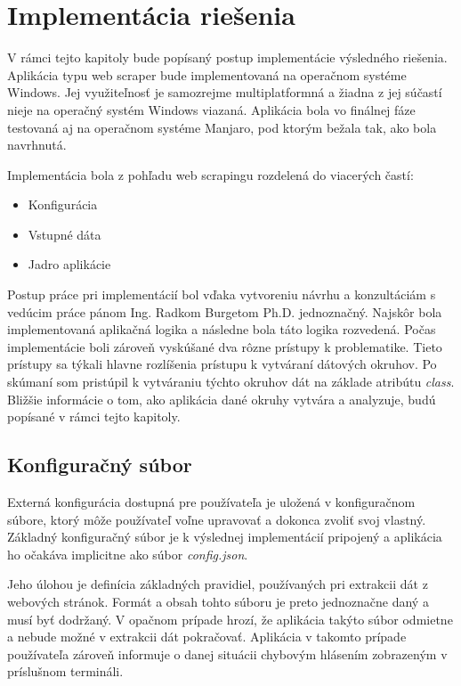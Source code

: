 \chapter{Implementácia riešenia}
\label{implementacia}

V rámci tejto kapitoly bude popísaný postup implementácie výsledného riešenia. Aplikácia typu web scraper bude implementovaná na operačnom systéme Windows. Jej využiteľnosť je samozrejme multiplatformná a žiadna z jej súčastí nieje na operačný systém Windows viazaná. Aplikácia bola vo finálnej fáze testovaná aj na operačnom systéme Manjaro, pod ktorým bežala tak, ako bola navrhnutá.

Implementácia bola z pohľadu web scrapingu rozdelená do viacerých častí:

\begin{itemize}
    \item {Konfigurácia}
    \item {Vstupné dáta}
    \item {Jadro aplikácie}
\end{itemize}

\bigskip

Postup práce pri implementácií bol vďaka vytvoreniu návrhu a konzultáciám s vedúcim práce pánom Ing. Radkom Burgetom Ph.D. jednoznačný. Najskôr bola implementovaná aplikačná logika a následne bola táto logika rozvedená. Počas implementácie boli zároveň vyskúšané dva rôzne prístupy k problematike. Tieto prístupy sa týkali hlavne rozlíšenia prístupu k vytváraní dátových okruhov. Po skúmaní som pristúpil k vytváraniu týchto okruhov dát na základe atribútu \textit{class}. Bližšie informácie o tom, ako aplikácia dané okruhy vytvára a analyzuje, budú popísané v rámci tejto kapitoly.

\section{Konfiguračný súbor}

Externá konfigurácia dostupná pre používateľa je uložená v konfiguračnom súbore, ktorý môže používateľ voľne upravovať a dokonca zvoliť svoj vlastný. Základný konfiguračný súbor je k výslednej implementácií pripojený a aplikácia ho očakáva implicitne ako súbor \textit{config.json}.

Jeho úlohou je definícia základných pravidiel, používaných pri extrakcii dát z webových stránok. Formát a obsah tohto súboru je preto jednoznačne daný a musí byť dodržaný. V opačnom prípade hrozí, že aplikácia takýto súbor odmietne a nebude možné v extrakcii dát pokračovať. Aplikácia v takomto prípade používateľa zároveň informuje o danej situácii chybovým hlásením zobrazeným v príslušnom termináli. 
\newpage

